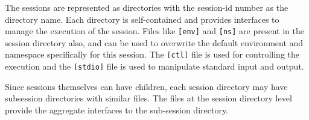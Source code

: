 The sessions are represented as directories with the session-id number as 
the directory name.
Each directory is  self-contained and provides interfaces to manage the
execution of the session.  Files like \texttt{[env]} and \texttt{[ns]} are
present in the session directory also, and can be used to overwrite the 
default environment and namespace specifically for this session.  
The \texttt{[ctl]} file is used for controlling the execution and 
the \texttt{[stdio]} file is used to manipulate standard input and output.  

Since sessions themselves can have children, each session directory may have
subsession directories with similar files.  The files at the session directory
level provide the aggregate interfaces to the sub-session directory.

%  

